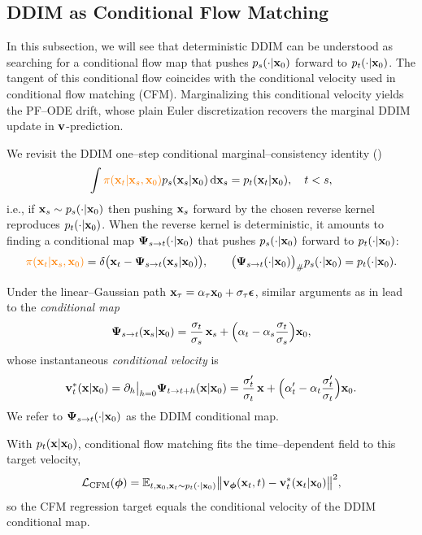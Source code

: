 \subsection{DDIM as Conditional Flow Matching}\label{subsec:ddim-cfm}
In this subsection, we will see that deterministic DDIM can be understood as searching for a conditional flow map that pushes $p_s(\cdot|{\mathbf{x}}_0)$ forward to $p_t(\cdot|{\mathbf{x}}_0)$.  
The tangent of this conditional flow coincides with the conditional velocity used in conditional flow matching (CFM).  
Marginalizing this conditional velocity yields the PF–ODE drift, whose plain Euler discretization recovers the marginal DDIM update in ${\mathbf{v}}$-prediction.

We revisit the DDIM one–step conditional marginal–consistency identity ()
\[
\int {\color{orange}\pi({\mathbf{x}}_t|{\mathbf{x}}_s,{\mathbf{x}}_0)} p_s({\mathbf{x}}_s|{\mathbf{x}}_0) \mathop{}\!\mathrm{d} {\mathbf{x}}_s
= p_t({\mathbf{x}}_t|{\mathbf{x}}_0), \quad t<s,
\]
i.e., if ${\mathbf{x}}_s\sim p_s(\cdot|{\mathbf{x}}_0)$ then pushing ${\mathbf{x}}_s$ forward by the chosen reverse kernel reproduces $p_t(\cdot|{\mathbf{x}}_0)$.  
When the reverse kernel is deterministic, it amounts to finding a conditional map 
${\bm{\Psi}}_{s\to t}(\cdot|{\mathbf{x}}_0)$ that pushes $p_s(\cdot|{\mathbf{x}}_0)$ forward to $p_t(\cdot|{\mathbf{x}}_0)$:
\[
{\color{orange}\pi({\mathbf{x}}_t|{\mathbf{x}}_s,{\mathbf{x}}_0)}
=\delta \big({\mathbf{x}}_t-{\bm{\Psi}}_{s\to t}({\mathbf{x}}_s|{\mathbf{x}}_0)\big),
\qquad
\bigl({\bm{\Psi}}_{s\to t}(\cdot|{\mathbf{x}}_0)\bigr)_{\#}p_s(\cdot|{\mathbf{x}}_0)=p_t(\cdot|{\mathbf{x}}_0).
\]


Under the linear–Gaussian path ${\mathbf{x}}_\tau=\alpha_\tau{\mathbf{x}}_0+\sigma_\tau{\bm{\epsilon}}$, 
similar arguments as in  
lead to the \textit{conditional map}
\[
{\bm{\Psi}}_{s\to t}({\mathbf{x}}_s|{\mathbf{x}}_0)
=\frac{\sigma_t}{\sigma_s}\,{\mathbf{x}}_s
+\Bigl(\alpha_t-\alpha_s\frac{\sigma_t}{\sigma_s}\Bigr){\mathbf{x}}_0,
\]
whose instantaneous \textit{conditional velocity} is
\[
{\mathbf{v}}_t^{*}({\mathbf{x}}|{\mathbf{x}}_0)
=\partial_h \big|_{h=0}{\bm{\Psi}}_{t\to t+h}({\mathbf{x}}|{\mathbf{x}}_0)
=\frac{\sigma_t'}{\sigma_t}\,{\mathbf{x}}
+\Bigl(\alpha_t'-\alpha_t\frac{\sigma_t'}{\sigma_t}\Bigr){\mathbf{x}}_0.
\]
We refer to ${\bm{\Psi}}_{s\to t}(\cdot|{\mathbf{x}}_0)$ as the DDIM conditional map.

With $p_t({\mathbf{x}}|{\mathbf{x}}_0)$, conditional flow matching fits the time–dependent field to this target velocity,
\[
\mathcal L_{\mathrm{CFM}}({\bm{\phi}})
=\mathbb{E}_{t,{\mathbf{x}}_0,{\mathbf{x}}_t\sim p_t(\cdot|{\mathbf{x}}_0)}
\big\|{\mathbf{v}}_{\bm{\phi}}({\mathbf{x}}_t,t)-{\mathbf{v}}_t^{*}({\mathbf{x}}_t|{\mathbf{x}}_0)\big\|^2,
\]
so the CFM regression target equals the conditional velocity of the DDIM conditional map.


